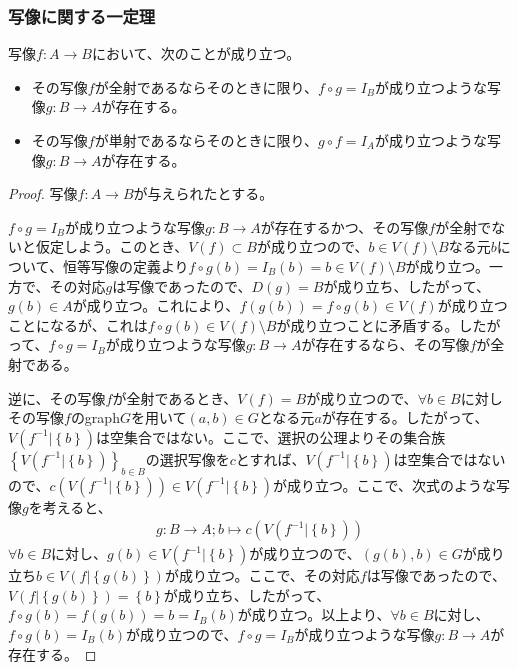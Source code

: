 \documentclass[dvipdfmx]{jsarticle}
\begin{document}
\subsubsection{写像に関する一定理}
\begin{thm}\label{1.2.5.4}
写像$f:A \rightarrow B$において、次のことが成り立つ。
\begin{itemize}
\item
  その写像$f$が全射であるならそのときに限り、$f \circ g = I_{B}$が成り立つような写像$g:B \rightarrow A$が存在する。
\item
  その写像$f$が単射であるならそのときに限り、$g \circ f = I_{A}$が成り立つような写像$g:B \rightarrow A$が存在する。
\end{itemize}
\end{thm}
\begin{proof} 写像$f:A \rightarrow B$が与えられたとする。\par
$f \circ g = I_{B}$が成り立つような写像$g:B \rightarrow A$が存在するかつ、その写像$f$が全射でないと仮定しよう。このとき、$V(f) \subset B$が成り立つので、$b \in V(f) \setminus B$なる元$b$について、恒等写像の定義より$f \circ g(b) = I_{B}(b) = b \in V(f) \setminus B$が成り立つ。一方で、その対応$g$は写像であったので、$D(g) = B$が成り立ち、したがって、$g(b) \in A$が成り立つ。これにより、$f\left( g(b) \right) = f \circ g(b) \in V(f)$が成り立つことになるが、これは$f \circ g(b) \in V(f) \setminus B$が成り立つことに矛盾する。したがって、$f \circ g = I_{B}$が成り立つような写像$g:B \rightarrow A$が存在するなら、その写像$f$が全射である。\par
逆に、その写像$f$が全射であるとき、$V(f) = B$が成り立つので、$\forall b \in B$に対しその写像$f$のgraph$G$を用いて$(a,b) \in G$となる元$a$が存在する。したがって、$V\left( f^{- 1}|\left\{ b \right\} \right)$は空集合ではない。ここで、選択の公理よりその集合族$\left\{ V\left( f^{- 1}|\left\{ b \right\} \right) \right\}_{b \in B}$の選択写像を$c$とすれば、$V\left( f^{- 1}|\left\{ b \right\} \right)$は空集合ではないので、$c\left( V\left( f^{- 1}|\left\{ b \right\} \right) \right) \in V\left( f^{- 1}|\left\{ b \right\} \right)$が成り立つ。ここで、次式のような写像$g$を考えると、
\begin{align*}
g:B \rightarrow A;b \mapsto c\left( V\left( f^{- 1}|\left\{ b \right\} \right) \right)
\end{align*}
$\forall b \in B$に対し、$g(b) \in V\left( f^{- 1}|\left\{ b \right\} \right)$が成り立つので、$\left( g(b),b \right) \in G$が成り立ち$b \in V\left( f|\left\{ g(b) \right\} \right)$が成り立つ。ここで、その対応$f$は写像であったので、$V\left( f|\left\{ g(b) \right\} \right) = \left\{ b \right\}$が成り立ち、したがって、$f \circ g(b) = f\left( g(b) \right) = b = I_{B}(b)$が成り立つ。以上より、$\forall b \in B$に対し、$f \circ g(b) = I_{B}(b)$が成り立つので、$f \circ g = I_{B}$が成り立つような写像$g:B \rightarrow A$が存在する。\par

\end{proof}
\end{document}
